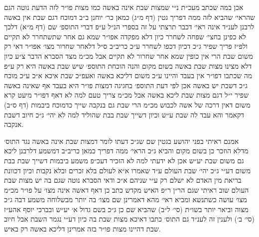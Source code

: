 \documentclass[12pt, openany]{book}
\begin{document}
\begin{multicols}{2}
אכן במה שכתב מעכ״ת נ״י שמצות שבת אינה באשה כמו מצות פו״ר לזה הדעת נוטה הגם שהראי׳ שהביא לזה ממה דפריך גטין (דף מ״ג) כמאן כר׳ יוחנן ב״ב דמוכח דגם שבת אין באשה לרבנן לענ״ד אינה ראי׳ דכבר תרצתי על זה בספרי הנ״ל ע״פ דברי התוספ׳ שם (דף מ״א) דלכך לא כפינן בחצי׳ שפחה לשחרר כיון דלא מפקדה אפו״ר שמא גם אחר שתשתחרר לא תקיים ולפ״ז פריך שפיר ג״כ דכיון דכפו לשחרר ע״כ כריב״ב ס״ל דלאחר שחרור מצו׳ אפו״ר דאי רק משום שבת הרי אין כופין שמא אחר שחרור לא תקיים אבל מכ״מ מצד הסברא הדבר צ״ע כיון דלא מצינו מצות שבת באשה בשום מקום והנה הוכחת התוספ׳ שיש שבת באשה היא רק ע״פ מה שכתבו דפו״ר אין בעבד והיינו ע״כ משום דליכא באשה ואעפ״כ שבת איכא א״כ ע״כ מוכח ג״כ דשבת יש באשה אכן לפי דעת התוספ׳ בחגיגה דמצות פו״ר היא בעבד אף שאינה באשה שפיר י״ל דגם מצות שבת ליכא באשה אבל מכ״מ צריך טעם למה לא דאף דפו״ר מיעט קרא משום דאין דרכה של אשה לכבוש מכ״מ הרי שבת גם בנקבה שייך כדמוכח ביבמות (דף ס״ב) דקאמר והא עבד לה שבת ע״ש וכיון דשייך שבת בבת שהוליד למה לא יהי׳ ג״כ חיוב דשבת אנקבה.\\\vspace{0pt}

אמנם ראיתי בפני יהושע בגטין שם שג״כ דעתו לומר דמצות שבת אינה באשה נגד התוס׳ מדלא הוזכר כן בשום מקום והביא ג״כ הראי׳ ממה דפריך כמאן כריב״ב דמשמע דלרבנן ליכא גם משום שבת יע״ש אכן לא ידעתי למה לא הזכיר דעכ״פ משמע ביבמות דשייך שבת בבת משום דע״י ג״כ יהי׳ שבת העולם ע״ד שאמרו א״א לעולם בלא זכרים ובלא נקבות וכיון דכוונת בריאת מין האדם לא ישלם רק ע״י שניהם א״כ ודאי הסברא נוטה שגם בה יש מצות שבת העולם שוב ראיתי שגם הר״ן ר״פ האיש מקדש כתב כן דאף דאשה אינה מצו׳ על פו״ר מכ״מ מצו׳ עושה כשתנשא ומביא ראי׳ מהא דאמרינן שם מצו׳ בה יותר מבשלוחה משמע דבה ג״כ מצוה וביאר יותר בשו״ת (סי׳ ל״ב) שהביא שם כן ג״כ בשם גדול א׳ יע״ש ובברכי יוסף אהע״ז (סי׳ ב׳) ולענין זה לענ״ד גם התוס׳ כתבו דאיכא מצות שבת בה כיון דע״י נגמר השבת אבל חיוב שבת דהיינו מצות פו״ר בזה אמרינן דליכא באשה רק באיש.\\\vspace{0pt}


\end{multicols}
\end{document}
